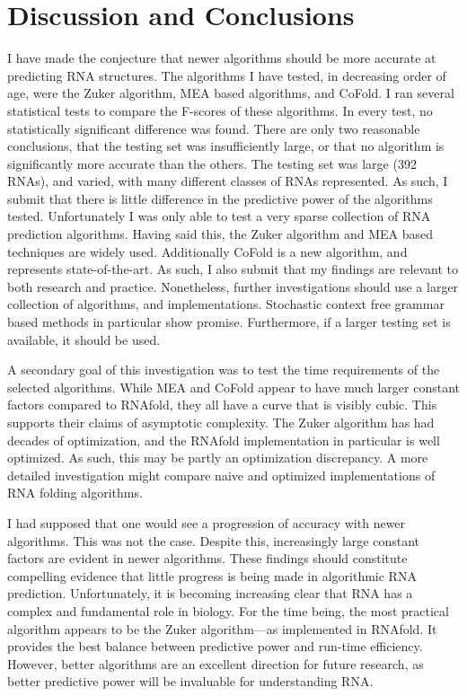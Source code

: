 \documentclass[12pt, a4paper]{article}
\begin{document}
\section{Discussion and Conclusions}
I have made the conjecture that newer algorithms should be more accurate at predicting RNA structures. The algorithms I have tested, in decreasing order of age, were the Zuker algorithm, MEA based algorithms, and CoFold. I ran several statistical tests to compare the F-scores of these algorithms. In every test, no statistically significant difference was found. There are only two reasonable conclusions, that the testing set was insufficiently large, or that no algorithm is significantly more accurate than the others. The testing set was large (392 RNAs), and varied, with many different classes of RNAs represented. As such, I submit that there is little difference in the predictive power of the algorithms tested. Unfortunately I was only able to test a very sparse collection of RNA prediction algorithms. Having said this, the Zuker algorithm and MEA based techniques are widely used. Additionally CoFold is a new algorithm, and represents state-of-the-art. As such, I also submit that my findings are relevant to both research and practice. Nonetheless, further investigations should use a larger collection of algorithms, and implementations. Stochastic context free grammar based methods in particular show promise. Furthermore, if a larger testing set is available, it should be used.

A secondary goal of this investigation was to test the time requirements of the selected algorithms. While MEA and CoFold appear to have much larger constant factors compared to RNAfold, they all have a curve that is visibly cubic. This supports their claims of asymptotic complexity. The Zuker algorithm has had decades of optimization, and the RNAfold implementation in particular is well optimized. As such, this may be partly an optimization discrepancy. A more detailed investigation might compare naive and optimized implementations of RNA folding algorithms.

I had supposed that one would see a progression of accuracy with newer algorithms. This was not the case. Despite this, increasingly large constant factors are evident in newer algorithms. These findings should constitute compelling evidence that little progress is being made in algorithmic RNA prediction. Unfortunately, it is becoming increasing clear that RNA has a complex and fundamental role in biology. For the time being, the most practical algorithm appears to be the Zuker algorithm---as implemented in RNAfold. It provides the best balance between predictive power and run-time efficiency. However, better algorithms are an excellent direction for future research, as better predictive power will be invaluable for understanding RNA.





\end{document}
